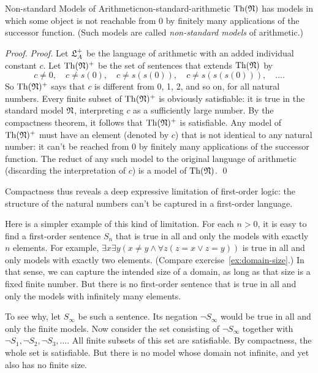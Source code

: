 \begin{theorem}{Non-standard Models of Arithmetic}{non-standard-arithmetic}
  $\mathrm{Th}(\mathfrak{N})$ has models in which
  some object is not reachable from 0
  by finitely many applications of the successor function.
  (Such models are called \emph{non-standard models} of arithmetic.)
\end{theorem}
\begin{proof}
  \emph{Proof.}
  Let $\mathfrak{L}_A^+$ be the language of arithmetic
  with an added individual constant $c$.
  Let $\mathrm{Th}(\mathfrak{N})^+$ be the set of sentences that
  extends $\mathrm{Th}(\mathfrak{N})$ by
  \[
    c \ne 0, \quad c \ne s(0), \quad c \ne s(s(0)), \quad c \ne s(s(s(0))), \quad\ldots.
  \]
  So $\mathrm{Th}(\mathfrak{N})^+$ says that
  $c$ is different from 0, 1, 2, and so on, for all natural numbers.
  Every finite subset of $\mathrm{Th}(\mathfrak{N})^+$ is obviously satisfiable:
  it is true in the standard model $\mathfrak{N}$,
  interpreting $c$ as a sufficiently large number.
  By the compactness theorem,
  it follows that $\mathrm{Th}(\mathfrak{N})^+$ is satisfiable.
  Any model of $\mathrm{Th}(\mathfrak{N})^+$
  must have an element (denoted by $c$) that
  is not identical to any natural number:
  it can't be reached from 0 by finitely many applications of the successor function.
  The reduct of any such model to the original language of arithmetic
  (discarding the interpretation of $c$)
  is a model of $\mathrm{Th}(\mathfrak{N})$.
  \qed
\end{proof}

Compactness thus reveals a deep expressive limitation of first-order logic:
the structure of the natural numbers can't be captured in a first-order language.

Here is a simpler example of this kind of limitation.
For each $n>0$,
it is easy to find a first-order sentence $S_n$ that is true in all and only
the models with exactly $n$ elements.
For example,
$\exists x \exists y (x \ne y \land \forall z (z=x \lor z=y))$
is true in all and only models with exactly two elements.
(Compare exercise~\ref{ex:domain-size}.)
In that sense,
we can capture the intended size of a domain,
as long as that size is a fixed finite number.
But there is no first-order sentence
that is true in all and only
the models with infinitely many elements.

To see why,
let $S_\infty$ be such a sentence.
Its negation $\neg S_\infty$ would be true in all and only
the finite models.
Now consider the set consisting of $\neg S_\infty$ together with
$\neg S_1, \neg S_2, \neg S_3, \ldots$.
All finite subsets of this set are satisfiable.
By compactness,
the whole set is satisfiable.
But there is no model whose domain not infinite,
and yet also has no finite size.


